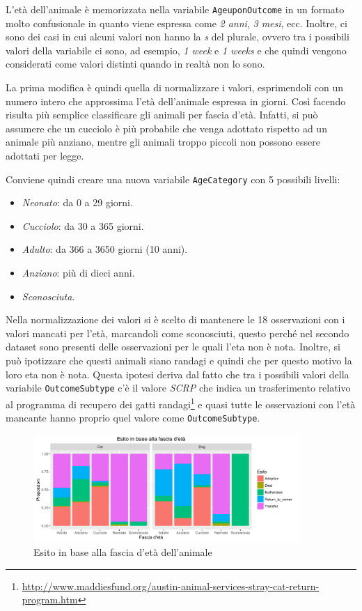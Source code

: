 L'età dell'animale è memorizzata nella variabile \texttt{AgeuponOutcome} in un formato molto confusionale in quanto viene espressa come \textit{2 anni}, \textit{3 mesi}, ecc. Inoltre, ci sono dei casi in cui alcuni valori non hanno la \textit{s} del plurale, ovvero tra i possibili valori della variabile ci sono, ad esempio, \textit{1 week} e \textit{1 weeks} e che quindi vengono considerati come valori distinti quando in realtà non lo sono.

La prima modifica è quindi quella di normalizzare i valori, esprimendoli con un numero intero che approssima l'età dell'animale espressa in giorni. Così facendo risulta più semplice classificare gli animali per fascia d'età. Infatti, si può assumere che un cucciolo è più probabile che venga adottato rispetto ad un animale più anziano, mentre gli animali troppo piccoli non possono essere adottati per legge.

Conviene quindi creare una nuova variabile \texttt{AgeCategory} con 5 possibili livelli:

\begin{itemize}
	\item \textit{Neonato}: da 0 a 29 giorni.
	\item \textit{Cucciolo}: da 30 a 365 giorni.
	\item \textit{Adulto}: da 366 a 3650 giorni (10 anni).
	\item \textit{Anziano}: più di dieci anni.
	\item \textit{Sconosciuta}.
\end{itemize}

Nella normalizzazione dei valori si è scelto di mantenere le 18 osservazioni con i valori mancati per l'età, marcandoli come sconosciuti, questo perché nel secondo dataset sono presenti delle osservazioni per le quali l'eta non è nota. Inoltre, si può ipotizzare che questi animali siano randagi e quindi che per questo motivo la loro eta non è nota.
Questa ipotesi deriva dal fatto che tra i possibili valori della variabile \texttt{OutcomeSubtype} c'è il valore \textit{SCRP} che indica un trasferimento relativo al programma di recupero dei gatti randagi\footnote{\url{http://www.maddiesfund.org/austin-animal-services-stray-cat-return-program.htm}} e quasi tutte le osservazioni con l'età mancante hanno proprio quel valore come \texttt{OutcomeSubtype}.

\begin{figure}[htbp]
	\centering
	\includegraphics[width=0.9\textwidth]{./grafici/esito_eta.pdf}
	\caption{Esito in base alla fascia d'età dell'animale}\label{fig-eta}
\end{figure}

